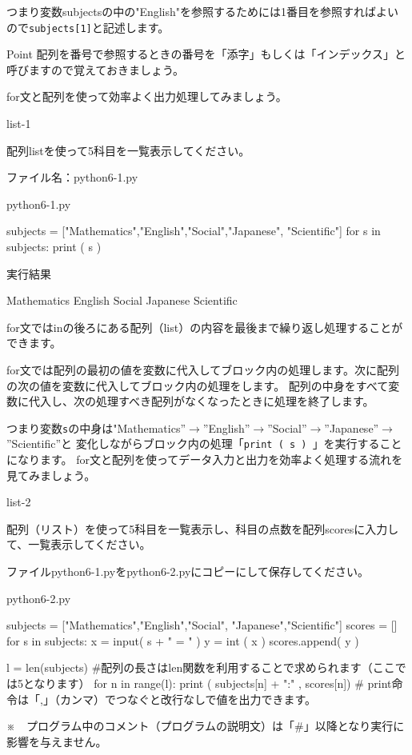 \documentclass[11pt,a4paper,dvipdfmx,titlepage]{jsreport}
\begin{document}
つまり変数subjectsの中の"English"を参照するためには1番目を参照すればよいので{\tt subjects[1]}と記述します。

\begin{hipoint}{Point}
配列を番号で参照するときの番号を「添字」もしくは「インデックス」と呼びますので覚えておきましょう。
\end{hipoint}
\newpage
for文と配列を使って効率よく出力処理してみましょう。

\begin{pabox}{list-1}

配列listを使って5科目を一覧表示してください。

ファイル名：python6-1.py
\begin{legbox}{python6-1.py}
\begin{listing}{1}
subjects = ["Mathematics","English","Social","Japanese",
"Scientific"]
for s in subjects:
    print ( s )
\end{listing}
実行結果
\begin{listing}{1}
Mathematics
English
Social
Japanese
Scientific
\end{listing}
\end{legbox}
for文ではinの後ろにある配列（list）の内容を最後まで繰り返し処理することができます。
\end{pabox}
for文では配列の最初の値を変数に代入してブロック内の処理します。次に配列の次の値を変数に代入してブロック内の処理をします。
配列の中身をすべて変数に代入し、次の処理すべき配列がなくなったときに処理を終了します。

つまり変数{\tt s}の中身は"Mathematics”$\rightarrow$”English”$\rightarrow$”Social”$\rightarrow$”Japanese”$\rightarrow$”Scientific”と
変化しながらブロック内の処理「{\tt print ( s ) }」を実行することになります。
\newpage
for文と配列を使ってデータ入力と出力を効率よく処理する流れを見てみましょう。
\begin{pabox}{list-2}

配列（リスト）を使って5科目を一覧表示し、科目の点数を配列scoresに入力して、一覧表示してください。

ファイルpython6-1.pyをpython6-2.pyにコピーにして保存してください。
\begin{legbox}{python6-2.py}
\begin{listing}{1}
subjects = ["Mathematics","English","Social",
    "Japanese","Scientific"]
scores = [] 
for s in subjects:
    x = input( s + " = " )
    y = int ( x )
    scores.append( y )

l = len(subjects)
#配列の長さはlen関数を利用することで求められます（ここでは5となります）
for n in range(l):
    print ( subjects[n] + ":" , scores[n])
# print命令は「,」（カンマ）でつなぐと改行なしで値を出力できます。
\end{listing}
\end{legbox}

※　プログラム中のコメント（プログラムの説明文）は「\#」以降となり実行に影響を与えません。
\end{pabox}
\end{document}
